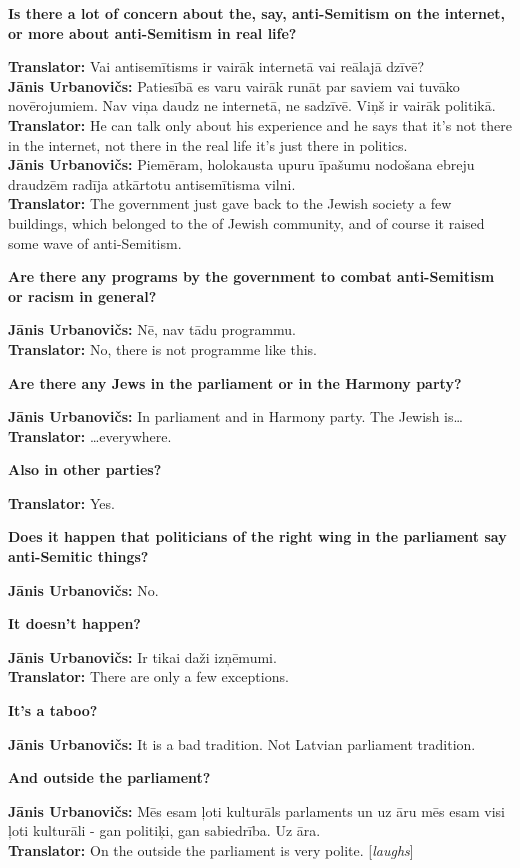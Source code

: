\textbf{Is there a lot of concern about the, say, anti-Semitism on the internet, or more about anti-Semitism in real life?} 

\textbf{Translator:} Vai antisemītisms ir vairāk internetā vai reālajā dzīvē?\\ 
\textbf{Jānis Urbanovičs:} Patiesībā es varu vairāk runāt par saviem vai tuvāko novērojumiem. Nav viņa daudz ne internetā, ne sadzīvē. Viņš ir vairāk politikā. \\
\textbf{Translator:} He can talk only about his experience and he says that it's not there in the internet, not there in the real life it’s just there in politics.\\ 
\textbf{Jānis Urbanovičs:} Piemēram, holokausta upuru īpašumu nodošana ebreju draudzēm radīja atkārtotu antisemītisma vilni.\\
\textbf{Translator:} The government just gave back to the Jewish society a few buildings, which belonged to the of Jewish community, and of course it raised some wave of anti-Semitism.  

\textbf{Are there any programs by the government to combat anti-Semitism or racism in general?}  

\textbf{Jānis Urbanovičs:} Nē, nav tādu programmu.\\
\textbf{Translator:} No, there is not programme like this.

\textbf{Are there any Jews in the parliament or in the Harmony party?}  

\textbf{Jānis Urbanovičs:} In parliament and in Harmony party. The Jewish is… 
\textbf{Translator:} …everywhere. 

\textbf{Also in other parties?}  

\textbf{Translator:} Yes. 

\textbf{Does it happen that politicians of the right wing in the parliament say anti-Semitic things?}  

\textbf{Jānis Urbanovičs:} No.  

\textbf{It doesn't happen?} 

\textbf{Jānis Urbanovičs:} Ir tikai daži izņēmumi.\\  
\textbf{Translator:} There are only a few exceptions.  

\textbf{It's a taboo?} 

\textbf{Jānis Urbanovičs:} It is a bad tradition. Not Latvian parliament tradition. 

\textbf{And outside the parliament?}  

\textbf{Jānis Urbanovičs:} Mēs esam ļoti kulturāls parlaments un uz āru mēs esam visi ļoti kulturāli - gan politiķi, gan sabiedrība. Uz āra.\\  
\textbf{Translator:} On the outside the parliament is very polite. [\textit{laughs}] 

